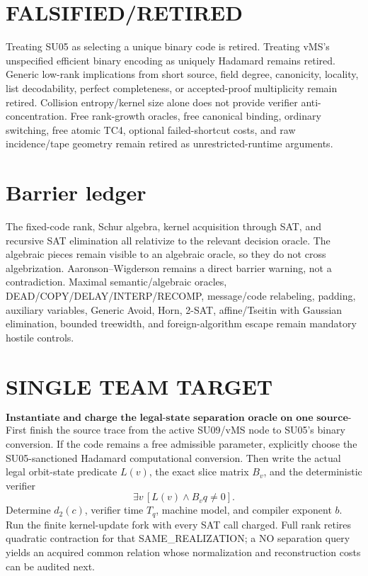 \documentclass[11pt]{article}
\begin{document}
\section*{FALSIFIED/RETIRED}
Treating SU05 as selecting a unique binary code is retired. Treating vMS's unspecified efficient binary encoding as uniquely Hadamard remains retired. Generic low-rank implications from short source, field degree, canonicity, locality, list decodability, perfect completeness, or accepted-proof multiplicity remain retired. Collision entropy/kernel size alone does not provide verifier anti-concentration. Free rank-growth oracles, free canonical binding, ordinary switching, free atomic TC4, optional failed-shortcut costs, and raw incidence/tape geometry remain retired as unrestricted-runtime arguments.

\section*{Barrier ledger}
The fixed-code rank, Schur algebra, kernel acquisition through SAT, and recursive SAT elimination all relativize to the relevant decision oracle. The algebraic pieces remain visible to an algebraic oracle, so they do not cross algebrization. Aaronson--Wigderson remains a direct barrier warning, not a contradiction. Maximal semantic/algebraic oracles, DEAD/COPY/DELAY/INTERP/RECOMP, message/code relabeling, padding, auxiliary variables, Generic Avoid, Horn, 2-SAT, affine/Tseitin with Gaussian elimination, bounded treewidth, and foreign-algorithm escape remain mandatory hostile controls.

\section*{SINGLE TEAM TARGET}
\[
\boxed{\textbf{Instantiate and charge the legal-state separation oracle on one source-legal realization.}}
\]
First finish the source trace from the active SU09/vMS node to SU05's binary conversion. If the code remains a free admissible parameter, explicitly choose the SU05-sanctioned Hadamard computational conversion. Then write the actual legal orbit-state predicate \(L(v)\), the exact slice matrix \(B_v\), and the deterministic verifier
\[
\exists v\,[L(v)\wedge B_vq\ne0].
\]
Determine \(d_2(c)\), verifier time \(T_q\), machine model, and compiler exponent \(b\). Run the finite kernel-update fork with every SAT call charged. Full rank retires quadratic contraction for that SAME\_REALIZATION; a NO separation query yields an acquired common relation whose normalization and reconstruction costs can be audited next.
\end{document}

